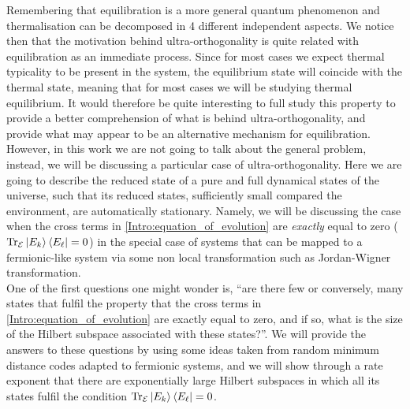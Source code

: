 \indent Remembering that equilibration is a more general quantum phenomenon and thermalisation can be  decomposed in 4 different independent aspects. We notice then that the motivation behind ultra-orthogonality is quite related with equilibration as an immediate process. Since for most cases we expect thermal typicality to be present in the system, the equilibrium state will coincide with the thermal state, meaning that for most cases we will be studying thermal equilibrium.
It would therefore be quite interesting to full study this property to provide a better comprehension of what is behind ultra-orthogonality, and provide what may appear to be an alternative mechanism for equilibration. However, in this work we are not going to talk about the general problem, instead, we will be discussing a particular case of ultra-orthogonality. Here we are going to describe the reduced state of a pure and full dynamical states of the universe, such that its reduced states, sufficiently small compared the environment, are automatically stationary. Namely, we will be discussing the case when the cross terms in \eqref{Intro:equation_of_evolution} are \textit{exactly} equal to zero ($\operatorname{Tr}_{\mathcal{E}}\mathinner{|{E_k}\rangle}\mathinner{\langle{E_\ell}|} = 0$) in the special case of systems that can be mapped to a fermionic-like system via some non local transformation such as Jordan-Wigner transformation\cite{reyes-lega_aspects_2016}.\\


\indent One of the first questions one might wonder is, ``are there few or conversely, many states that fulfil the property that the cross terms in \eqref{Intro:equation_of_evolution} are exactly equal to zero, and if so, what is the size of the Hilbert subspace associated with these states?''. We will provide the answers to these questions by using some ideas taken from random minimum distance codes adapted to fermionic systems, and we will show through a rate exponent that there are exponentially large Hilbert subspaces in which all its states fulfil the condition $\operatorname{Tr}_{\mathcal{E}}\mathinner{|{E_k}\rangle}\mathinner{\langle{E_\ell}|} = 0$.\\

